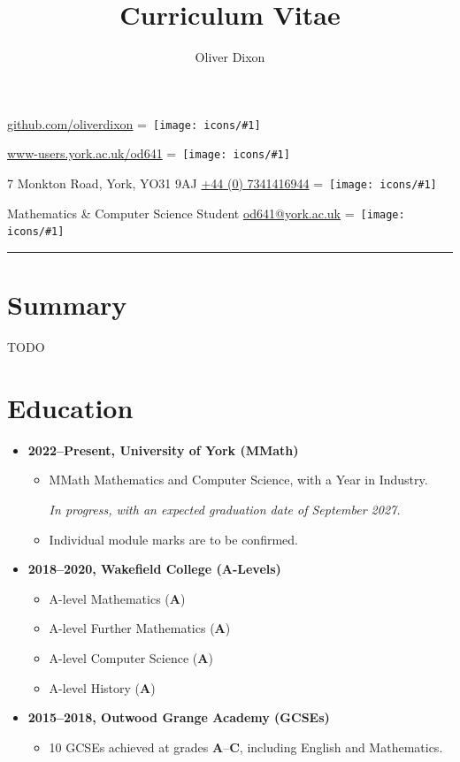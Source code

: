 \documentclass{article}
\title{Curriculum Vitae}
\author{Oliver Dixon}
\renewcommand{\footrulewidth}{.4pt}
\newcommand{\sociallink}[3]{%
        \raggedleft
        {\large \href{#3}{#2}}
        \hspace{1pt}
        \begingroup
        \setbox0=\hbox{%
                \texttt{[image: icons/\#1]}
        }%
        \parbox{\wd0}{\box0}
        \endgroup

        \raggedright
}
\newcommand{\midtilde}{\raisebox{.5ex}{\texttildelow}}
\newcommand{\textline}{\par\rule{\textwidth}{\footrulewidth}}
\begin{document}
\thispagestyle{title}
\pagestyle{body}
\begin{center}
        \Large
        \makeatletter
        \textbf{\@author} \hfill
        \sociallink{github}{github.com/oliverdixon}%
                {https://github.com/oliverdixon}

        \hspace{-2pt}\textit{\@title} \hfill
        \sociallink{internet}{www-users.york.ac.uk/\midtilde{}od641}%
                {https://www-users.york.ac.uk/~od641}
        \makeatother

        \vspace{.5\baselineskip}
        \large
        7 Monkton Road, York, YO31 9AJ \hfill
        \sociallink{telephone}{+44 (0) 7341416944}{tel:+447341416944}

        \vspace{.2\baselineskip}
        Mathematics \& Computer Science Student\hfill
        \sociallink{email}{od641@york.ac.uk}{mailto:od641@york.ac.uk}
\end{center}
\textline
\section{Summary}
TODO

\section{Education}
\begin{itemize}
        \item \textbf{2022--Present, University of York (MMath)}
        \begin{itemize}
                \item MMath Mathematics and Computer Science, with a Year in
                Industry.

                \textit{In progress, with an expected graduation date of
                September 2027.}

                \item Individual module marks are to be confirmed.
        \end{itemize}
        \item \textbf{2018--2020, Wakefield College (A-Levels)}
        \begin{itemize}
                \item A-level Mathematics (\textbf{A})
                \item A-level Further Mathematics (\textbf{A})
                \item A-level Computer Science (\textbf{A})
                \item A-level History (\textbf{A})
        \end{itemize}
        \item \textbf{2015--2018, Outwood Grange Academy (GCSEs)}
        \begin{itemize}
                \item 10 GCSEs achieved at grades \textbf{A}--\textbf{C},
                including English and Mathematics.
        \end{itemize}
\end{itemize}
\end{document}
